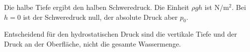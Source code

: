 \begin{kontrolle}[Plausibilität]
Die halbe Tiefe ergibt den halben Schweredruck. Die Einheit
\(\rho gh\) ist \(\si{\newton\per\metre\squared}\). Bei \(h=0\) ist
der Schweredruck null, der absolute Druck aber \(p_0\).
\end{kontrolle}

\begin{merksatz}
Entscheidend für den hydrostatischen Druck sind die vertikale Tiefe und der
Druck an der Oberfläche, nicht die gesamte Wassermenge.
\end{merksatz}

